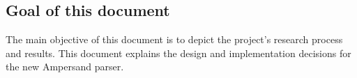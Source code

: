 
\subsection{Goal of this document}
The main objective of this document is to depict the project's research process and results.
This document explains the design and implementation decisions for the new Ampersand parser.
